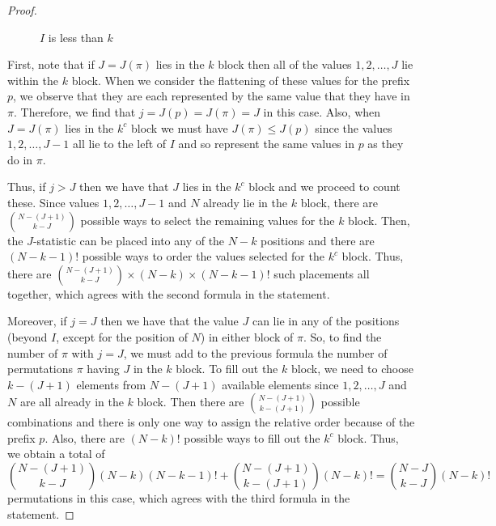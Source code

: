 \documentclass[11pt]{amsart}   %
\theoremstyle{definition}
\theoremstyle{remark}
\numberwithin{equation}{section}
\theoremstyle{theorem}
\begin{document}
\begin{proof}
\begin{figure}[htbp]
\caption{$I$ is less than $k$}
\label{fig:Case3}
\end{figure}

First, note that if $J = J(\pi)$ lies in the $k$ block then all of the values
$1, 2, \ldots, J$ lie within the $k$ block.  When we consider the flattening of
these values for the prefix $p$, we observe that they are each represented by
the same value that they have in $\pi$.  Therefore, we find that $j = J(p) =
J(\pi) = J$ in this case.  Also, when $J = J(\pi)$ lies in the $k^c$ block we
must have $J(\pi) \leq J(p)$ since the values $1, 2, \ldots, J-1$ all lie to
the left of $I$ and so represent the same values in $p$ as they do in $\pi$.

Thus, if $j > J$ then we have that $J$ lies in the $k^c$ block and
we proceed to count these.  Since values $1, 2, \ldots, J-1$ and $N$ already
lie in the $k$ block, there are $\binom{N-(J+1)}{k-J}$ possible ways to select
the remaining values for the $k$ block.  Then, the $J$-statistic can be placed
into any of the $N-k$ positions and there are $(N-k-1)!$ possible ways to order
the values selected for the $k^c$ block.  Thus, there are
$\binom{N-(J+1)}{k-J}\times (N-k) \times (N-k-1)!$ such placements all
together, which agrees with the second formula in the statement.

Moreover, if $j = J$ then we have that the value $J$ can lie in any of the
positions (beyond $I$, except for the position of $N$) in either block of
$\pi$.  So, to find the number of $\pi$ with $j = J$, we must add to the previous
formula the number of permutations $\pi$ having $J$ in the $k$ block.  To fill
out the $k$ block, we need to choose $k-(J+1)$ elements from $N-(J+1)$
available elements since $1, 2, \ldots, J$ and $N$ are all already in the $k$
block.  Then there are $\binom{N-(J+1)}{k-(J+1)}$ possible combinations and
there is only one way to assign the relative order because of the prefix $p$.
Also, there are $(N-k)!$ possible ways to fill out the $k^c$ block.  Thus, we
obtain a total of 
\[ \binom{N-(J+1)}{k-J} (N-k) (N-k-1)! + \binom{N-(J+1)}{k-(J+1)} (N-k)! = \binom{N-J}{k-J} (N-k)!\]
permutations in this case, which agrees with the third formula in the
statement.
\end{proof}
\end{document}
